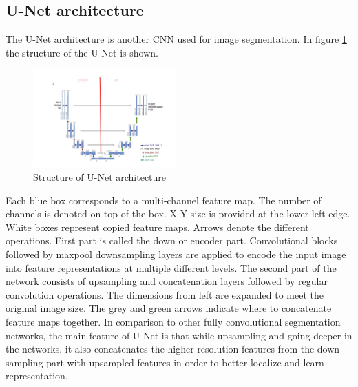 \subsection{U-Net architecture}
The U-Net architecture is another CNN used for image segmentation. In figure \ref{unetstructure} the structure of the U-Net is shown.\newline
\begin{figure}[h!]
	\includegraphics[width=0.49\textwidth, angle=0]{files/unetstructure.jpg}
	\caption{Structure of U-Net architecture}
	\label{unetstructure}
\end{figure}

Each blue box corresponds to a multi-channel feature map. The number of channels is denoted on top of the box. X-Y-size is provided at the lower left edge. White boxes represent copied feature maps. Arrows denote the different operations.\newline
First part is called the down or encoder part. Convolutional blocks followed by maxpool downsampling layers are applied to encode the input image into feature representations at multiple different levels. The second part of the network consists of upsampling and concatenation layers followed by regular convolution operations. The dimensions from left are expanded to meet the original image size. The grey and green arrows indicate where to concatenate feature maps together.\newline
In comparison to other fully convolutional segmentation networks, the main feature of U-Net is that while upsampling and going deeper in the networks, it also concatenates the higher resolution features from the down sampling part with upsampled features in order to better localize and learn representation.\newline

